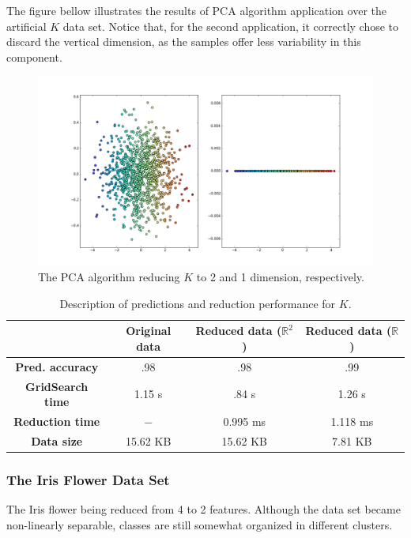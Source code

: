 \documentclass[12pt]{article}
\begin{document}
The figure bellow illustrates the results of PCA algorithm application over the artificial $K$ data set. Notice that, for the second application, it correctly chose to discard the vertical dimension, as the samples offer less variability in this component.

\begin{figure}[H]
	\centering
	\captionsetup{justification=centering}

	\includegraphics[width=.9\linewidth]{datasetrpca}
	\caption{The PCA algorithm reducing $K$ to 2 and 1 dimension, respectively.}
	\label{fig:datasetrpca}
\end{figure}

\begin{table}[H]
	\centering
	\begin{tabular}{|c|c|c|c|}
		\hline
		& \textbf{Original data} & \textbf{Reduced data ($\mathbb{R}^2$)} & \textbf{Reduced data ($\mathbb{R}$)} \\\hline
		\textbf{Pred. accuracy} & .98 & .98 & .99 \\\hline
		\textbf{GridSearch time} & 1.15 s & .84 s & 1.26 s \\\hline
		\textbf{Reduction time} & $-$ & 0.995 ms & 1.118 ms \\\hline
		\textbf{Data size} & 15.62 KB & 15.62 KB & 7.81 KB \\\hline
	\end{tabular}

	\caption{Description of predictions and reduction performance for $K$.}
\end{table}

\subsubsection{The Iris Flower Data Set}

The Iris flower being reduced from 4 to 2 features. Although the data set became non-linearly separable, classes are still somewhat organized in different clusters.
\end{document}
